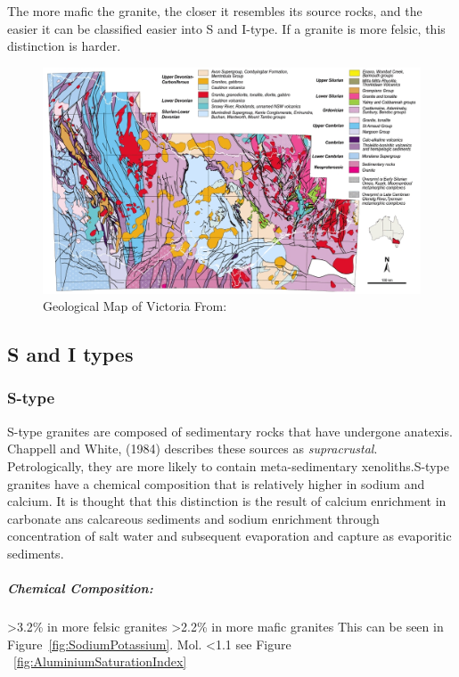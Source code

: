 \documentclass[a4paper]{article}
\begin{document}
The more mafic the granite, the closer it resembles its source rocks, and the easier it can be classified easier into S and I-type. If a granite is more felsic, this distinction is harder.   


\begin{figure}[H]
\centering
\includegraphics[width=1\textwidth]{vicmaprocktypes.jpg}
\caption{\label{fig:VicMapRockTypes}Geological Map of Victoria From: \cite{vandenberg2000tasman}}
\end{figure}

\subsection{S and I types}

\subsubsection{S-type}
S-type granites are composed of sedimentary rocks that have undergone anatexis. Chappell and White, (1984) describes these sources as \textit{supracrustal}.
Petrologically, they are more likely to contain meta-sedimentary xenoliths.S-type granites have a chemical composition that is relatively higher in sodium and calcium. It is thought that this distinction is the result of calcium enrichment in carbonate ans calcareous sediments and sodium enrichment through concentration of salt water and subsequent evaporation and capture as evaporitic sediments. 

\subparagraph{Chemical Composition:}

 \textgreater 3.2\% in more felsic granites\newline
{} \textgreater 2.2\% in more mafic granites\newline
This can be seen in Figure~\ref{fig:SodiumPotassium}.\newline\newline
Mol.  \textless 1.1 see Figure  ~\ref{fig:AluminiumSaturationIndex} \newline
\end{document}
